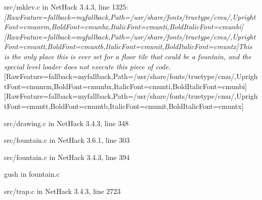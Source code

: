 \begin{myenumerate}
\item{} src/mklev.c in NetHack 3.4.3, line 1325\footnotemark[140]: {\itshape \allowbreak{}\setmainfont{cmunti.ttf}[RawFeature={fallback=myfallback},Path=/usr/share/fonts/truetype/cmu/,UprightFont=cmunrm,BoldFont=cmunbx,ItalicFont=cmunti,BoldItalicFont=cmunbi]\setmonofont{cmunti.ttf}[RawFeature={fallback=myfallback},Path=/usr/share/fonts/truetype/cmu/,UprightFont=cmuntt,BoldFont=cmuntb,ItalicFont=cmunit,BoldItalicFont=cmuntx]\itshape This is the only place this is ever set for a floor tile that could be a fountain, and the special level loader does not execute this piece of code.}\allowbreak{}\setmainfont{cmunrm.ttf}[RawFeature={fallback=myfallback},Path=/usr/share/fonts/truetype/cmu/,UprightFont=cmunrm,BoldFont=cmunbx,ItalicFont=cmunti,BoldItalicFont=cmunbi]\setmonofont{cmunrm.ttf}[RawFeature={fallback=myfallback},Path=/usr/share/fonts/truetype/cmu/,UprightFont=cmuntt,BoldFont=cmuntb,ItalicFont=cmunit,BoldItalicFont=cmuntx]
     

\item{} src/drawing.c in NetHack 3.4.3, line 348\footnotemark[141]
     

\item{} src/fountain.c in NetHack 3.6.1, line 303\footnotemark[142]
     

\item{} src/fountain.c in NetHack 3.4.3, line 394\footnotemark[143]
     

\item{} gush\footnotemark[144] in fountain.c\footnotemark[145]

\item{} \footnotemark[146]

\item{} src/trap.c in NetHack 3.4.3, line 2723\footnotemark[147]
     


\end{myenumerate}


